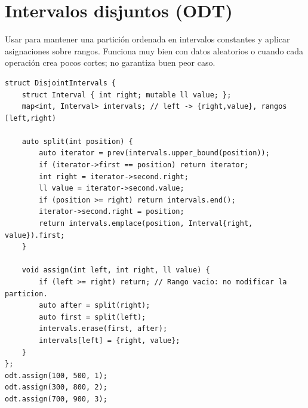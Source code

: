 \section{Intervalos disjuntos (ODT)}

Usar para mantener una partici\'on ordenada en intervalos constantes y aplicar
asignaciones sobre rangos. Funciona muy bien con datos aleatorios o cuando cada
operaci\'on crea pocos cortes; no garantiza buen peor caso.


\begin{lstlisting}[style=cpp]
struct DisjointIntervals {
    struct Interval { int right; mutable ll value; };
    map<int, Interval> intervals; // left -> {right,value}, rangos [left,right)

    auto split(int position) {
        auto iterator = prev(intervals.upper_bound(position));
        if (iterator->first == position) return iterator;
        int right = iterator->second.right;
        ll value = iterator->second.value;
        if (position >= right) return intervals.end();
        iterator->second.right = position;
        return intervals.emplace(position, Interval{right, value}).first;
    }

    void assign(int left, int right, ll value) {
        if (left >= right) return; // Rango vacio: no modificar la particion.
        auto after = split(right);
        auto first = split(left);
        intervals.erase(first, after);
        intervals[left] = {right, value};
    }
};
odt.assign(100, 500, 1);
odt.assign(300, 800, 2);
odt.assign(700, 900, 3);
\end{lstlisting}

